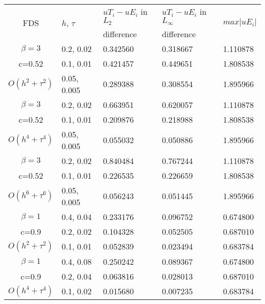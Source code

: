 \documentclass{article}
\begin{document}
\begin{table}[ht]
\centering
\small
		\begin{tabular}{||c|l|l|l|l||}
			\hline
			\hline
      \multirow{2  }{*}{FDS}        & \multirow{2  }{*}{$h$, $\tau$}  &   $uT_i - uE_i$  in $L_2$     &  $uT_i - uE_i$ in $L_\infty$ & \multirow{2  }{*}{$max|uE_i|$} \\
	                                        &                                                     &      difference                     &           difference                  &                                                       \\
   			\hline 
					\hline 
  $\beta=3$                   &0.2, 0.02         &  0.342560       & 0.318667  & 1.110878      \\
   c=0.52                        &0.1, 0.01         &  0.421457       & 0.449651 &  1.808538     \\
     $O(h^2 + \tau^ 2)$ &0.05, 0.005    & 0.289388         &0.308554  &   1.895966    \\
			\hline 
  $\beta=3$                 &0.2, 0.02        & 0.663951           &0.620057 & 1.110878     \\
   c=0.52                      &0.1, 0.01       & 0.209876            &0.218988 & 1.808538    \\
     $O(h^4+ \tau^4)$ &0.05,  0.005  &0.055032             &0.050886 & 1.895966    \\
			\hline 
  $\beta=3$                  &0.2, 0.02       & 0.840484             & 0.767244  &  1.110878  \\
     c=0.52                     &0.1, 0.01       & 0.226535             &  0.226659 &  1.808538  \\
     $O(h^6+ \tau^6)$  &0.05, 0.005  &  0.056243            &  0.051445 &   1.895966\\
	   \hline
			\hline 
       $\beta=1$          &0.4, 0.04        & 0.233176     & 0.096752 & 0.674800   \\
                  c=0.9      &0.2, 0.02        & 0.104328      & 0.052505  & 0.687010   \\
  $O(h^2+ \tau^2)$ &0.1, 0.01         & 0.052839      &0.023494 & 0.683784  \\
			\hline
      $\beta=1$               & 0.4, 0.08     & 0.250242    & 0.089367  & 0.674800    \\
       c=0.9                      & 0.2, 0.04      & 0.063816   &  0.028013 &  0.687010 \\
       $O(h^4+ \tau^4)$ & 0.1, 0.02   & 0.015680   &0.007235 &   0.683784 \\

\end{tabular}
\end{table}
\end{document}
